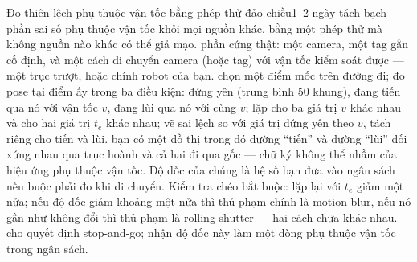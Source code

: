 \documentclass[../../marker.tex]{subfiles}
\begin{document}
\begin{ungdung}
\end{ungdung}

\begin{duan}{Đo thiên lệch phụ thuộc vận tốc bằng phép thử đảo chiều}{1--2 ngày}
\dmt tách bạch phần sai số phụ thuộc vận tốc khỏi mọi nguồn khác, bằng một phép thử mà không nguồn nào khác có thể giả mạo.
\ddl phần cứng thật: một camera, một tag gắn cố định, và một cách di chuyển camera (hoặc tag) với vận tốc kiểm soát được --- một trục trượt, hoặc chính robot của bạn.
\dbc chọn một điểm mốc trên đường đi; đo pose tại điểm ấy trong ba điều kiện: đứng yên (trung bình 50 khung), đang tiến qua nó với vận tốc \(v\), đang lùi qua nó với cùng \(v\); lặp cho ba giá trị \(v\) khác nhau và cho hai giá trị \(t_e\) khác nhau; vẽ sai lệch so với giá trị đứng yên theo \(v\), tách riêng cho tiến và lùi.
\dxk bạn có một đồ thị trong đó đường ``tiến'' và đường ``lùi'' đối xứng nhau qua trục hoành và cả hai đi qua gốc --- chữ ký không thể nhầm của hiệu ứng phụ thuộc vận tốc. Độ dốc của chúng là hệ số bạn đưa vào ngân sách nếu buộc phải đo khi di chuyển. Kiểm tra chéo bắt buộc: lặp lại với \(t_e\) giảm một nửa; nếu độ dốc giảm khoảng một nửa thì thủ phạm chính là motion blur, nếu nó gần như không đổi thì thủ phạm là rolling shutter --- hai cách chữa khác nhau.
\dnv {} cho quyết định stop-and-go;  nhận độ dốc này làm một dòng phụ thuộc vận tốc trong ngân sách.
\end{duan}
\end{document}
